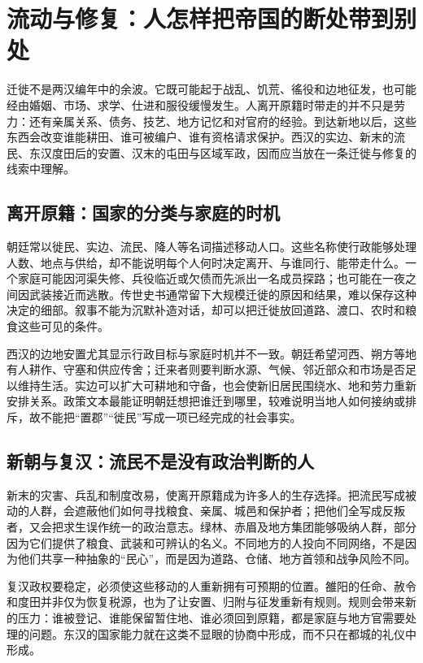 \section{流动与修复：人怎样把帝国的断处带到别处}
\label{sec:synthesis-mobility-repair}

迁徙不是两汉编年中的余波。它既可能起于战乱、饥荒、徭役和边地征发，也可能经由婚姻、市场、求学、仕进和服役缓慢发生。人离开原籍时带走的并不只是劳力：还有亲属关系、债务、技艺、地方记忆和对官府的经验。到达新地以后，这些东西会改变谁能耕田、谁可被编户、谁有资格请求保护。西汉的实边、新末的流民、东汉度田后的安置、汉末的屯田与区域军政，因而应当放在一条迁徙与修复的线索中理解。

\subsection{离开原籍：国家的分类与家庭的时机}

朝廷常以徙民、实边、流民、降人等名词描述移动人口。这些名称使行政能够处理人数、地点与供给，却不能说明每个人何时决定离开、与谁同行、能带走什么。一个家庭可能因河渠失修、兵役临近或欠债而先派出一名成员探路；也可能在一夜之间因武装接近而逃散。传世史书通常留下大规模迁徙的原因和结果，难以保存这种决定的细部。叙事不能为沉默补造对话，却可以把迁徙放回道路、渡口、农时和粮食这些可见的条件。

西汉的边地安置尤其显示行政目标与家庭时机并不一致。朝廷希望河西、朔方等地有人耕作、守塞和供应传舍；迁来者则要判断水源、气候、邻近部众和市场是否足以维持生活。实边可以扩大可耕地和守备，也会使新旧居民围绕水、地和劳力重新安排关系。政策文本最能证明朝廷想把谁迁到哪里，较难说明当地人如何接纳或排斥，故不能把“置郡”“徙民”写成一项已经完成的社会事实。

\subsection{新朝与复汉：流民不是没有政治判断的人}

新末的灾害、兵乱和制度改易，使离开原籍成为许多人的生存选择。把流民写成被动的人群，会遮蔽他们如何寻找粮食、亲属、城邑和保护者；把他们全写成反叛者，又会把求生误作统一的政治意志。绿林、赤眉及地方集团能够吸纳人群，部分因为它们提供了粮食、武装和可辨认的名义。不同地方的人投向不同网络，不是因为他们共享一种抽象的“民心”，而是因为道路、仓储、地方首领和战争风险不同。

复汉政权要稳定，必须使这些移动的人重新拥有可预期的位置。雒阳的任命、赦令和度田并非仅为恢复税源，也为了让安置、归附与征发重新有规则。规则会带来新的压力：谁被登记、谁能保留暂住地、谁必须回到原籍，都是家庭与地方官需要处理的问题。东汉的国家能力就在这类不显眼的协商中形成，而不只在都城的礼仪中形成。

